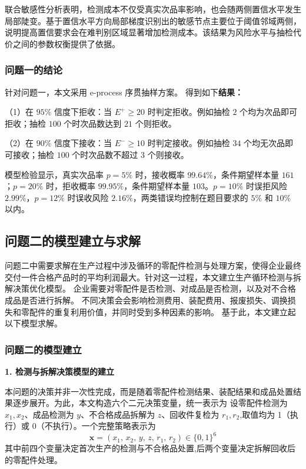 \documentclass[withoutpreface,bwprint]{cumcmthesis}
\numberwithin{equation}{section}
\begin{document}
联合敏感性分析表明，检测成本不仅受真实次品率影响，也会随两侧置信水平发生局部陡变。基于置信水平方向局部梯度识别出的敏感节点主要位于阈值邻域两侧，说明提高置信要求会在难判别区域显著增加检测成本。该结果为风险水平与抽检代价之间的参数权衡提供了依据。


\subsubsection{问题一的结论}

针对问题一，本文采用 e-process 序贯抽样方案。
得到如下\textbf{结果：}

（1）在 $95\%$ 信度下拒收：当 $E^+\geq 20$ 时判定拒收。例如抽检 $2$ 个均为次品即可拒收；抽检 $100$ 个时次品数达到 $21$ 个则拒收。

（2）在 $90\%$ 信度下接收：当 $E^-\geq 10$ 时判定接收。例如抽检 $34$ 个均无次品即可接收；抽检 $100$ 个时次品数不超过 $3$ 个则接收。

模型检验显示，真实次品率 $p=5\%$ 时，接收概率 $99.64\%$，条件期望样本量 $161$；$p=20\%$ 时，拒收概率 $99.95\%$，条件期望样本量 $103$。$p=10\%$ 时误拒风险 $2.99\%$，$p=12\%$ 时误收风险 $2.16\%$，两类错误均控制在题目要求的 $5\%$ 和 $10\%$ 以内。






\subsection{问题二的模型建立与求解}

问题二中需要求解在生产过程中涉及循环的零配件检测与处理方案，使得企业最终交付一件合格产品时的平均利润最大。针对这一过程，本文建立生产循环检测与拆解决策优化模型。
企业需要对零配件是否检测、对成品是否检测，以及对不合格成品是否进行拆解。
不同决策会会影响检测费用、装配费用、报废损失、调换损失和零配件的重复利用价值，并同时受到多种因素的影响。
基于此，本文建立起以下模型求解。









\subsubsection{问题二的模型建立}



\textbf{1. 检测与拆解决策模型的建立}

本问题的决策并非一次性完成，而是随着零配件检测结果、装配结果和成品处置结果逐步展开。为此，本文构造六个二元决策变量，统一表示为
设零配件检测为 $x_1,x_2$、成品检测为 $y$、不合格成品拆解为 $z$、回收件复检为 $r_1,r_2$,取值均为 1（执行）或 0（不执行）。一个完整策略表示为
\begin{equation}
\boldsymbol{x}=(x_1,\,x_2,\,y,\,z,\,r_1,\,r_2)\in\{0,1\}^6
\end{equation}
其中前四个变量决定首次生产的检测与不合格品处置,后两个变量决定拆解回收后的零配件处理。
\end{document}
